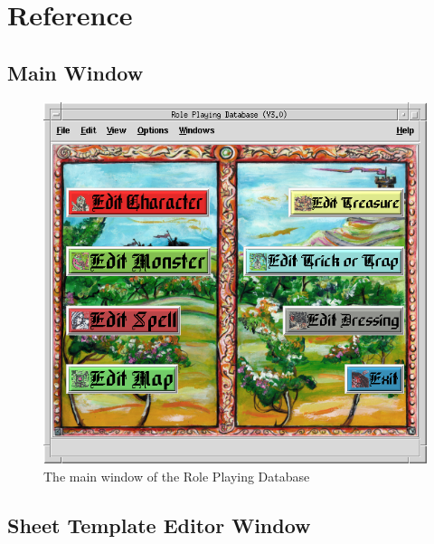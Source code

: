 \chapter{Reference}
\label{Reference}

\section{Main Window}
\label{Main}

\begin{figure}[hbpt]
\begin{centering}
\includegraphics[width=5in]{MainWindow.png}
\caption{The main window of the Role Playing Database}
\label{fig:main}
\end{centering}
\end{figure}

\section{Sheet Template Editor Window}
\label{Template}

